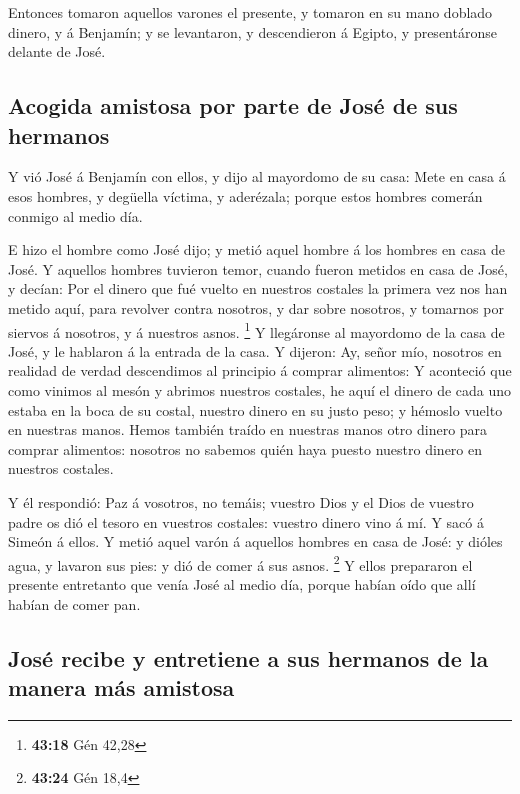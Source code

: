  Entonces tomaron aquellos varones el presente, y tomaron
en su mano doblado dinero, y á Benjamín; y se levantaron, y descendieron
á Egipto, y presentáronse delante de José.

\hypertarget{acogida-amistosa-por-parte-de-josuxe9-de-sus-hermanos}{%
\subsection{Acogida amistosa por parte de José de sus
hermanos}\label{acogida-amistosa-por-parte-de-josuxe9-de-sus-hermanos}}

 Y vió José á Benjamín con ellos, y dijo al mayordomo de su
casa: Mete en casa á esos hombres, y degüella víctima, y aderézala;
porque estos hombres comerán conmigo al medio día.

 E hizo el hombre como José dijo; y metió aquel hombre á
los hombres en casa de José.  Y aquellos hombres tuvieron
temor, cuando fueron metidos en casa de José, y decían: Por el dinero
que fué vuelto en nuestros costales la primera vez nos han metido aquí,
para revolver contra nosotros, y dar sobre nosotros, y tomarnos por
siervos á nosotros, y á nuestros asnos. \footnote{\textbf{43:18} Gén
  42,28}  Y llegáronse al mayordomo de la casa de José, y
le hablaron á la entrada de la casa.  Y dijeron: Ay, señor
mío, nosotros en realidad de verdad descendimos al principio á comprar
alimentos:  Y aconteció que como vinimos al mesón y abrimos
nuestros costales, he aquí el dinero de cada uno estaba en la boca de su
costal, nuestro dinero en su justo peso; y hémoslo vuelto en nuestras
manos.  Hemos también traído en nuestras manos otro dinero
para comprar alimentos: nosotros no sabemos quién haya puesto nuestro
dinero en nuestros costales.

 Y él respondió: Paz á vosotros, no temáis; vuestro Dios y
el Dios de vuestro padre os dió el tesoro en vuestros costales: vuestro
dinero vino á mí. Y sacó á Simeón á ellos.  Y metió aquel
varón á aquellos hombres en casa de José: y dióles agua, y lavaron sus
pies: y dió de comer á sus asnos. \footnote{\textbf{43:24} Gén 18,4}
 Y ellos prepararon el presente entretanto que venía José
al medio día, porque habían oído que allí habían de comer pan.

\hypertarget{josuxe9-recibe-y-entretiene-a-sus-hermanos-de-la-manera-muxe1s-amistosa}{%
\subsection{José recibe y entretiene a sus hermanos de la manera más
amistosa}\label{josuxe9-recibe-y-entretiene-a-sus-hermanos-de-la-manera-muxe1s-amistosa}}

